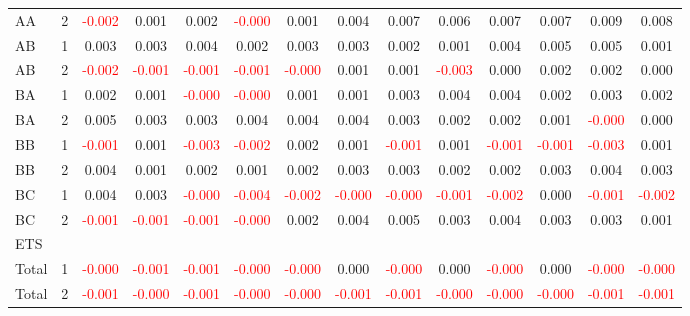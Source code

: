 \begin{table}[!htb]
{\begin{tabular}{llcccccccccccc}
AA & 2 & \textcolor{red}{-0.002} & 0.001 & 0.002 & \textcolor{red}{-0.000} & 0.001 & 0.004 & 0.007 & 0.006 & 0.007 & 0.007 & 0.009 & 0.008\\
AB & 1 & 0.003 & 0.003 & 0.004 & 0.002 & 0.003 & 0.003 & 0.002 & 0.001 & 0.004 & 0.005 & 0.005 & 0.001\\
AB & 2 & \textcolor{red}{-0.002} & \textcolor{red}{-0.001} & \textcolor{red}{-0.001} & \textcolor{red}{-0.001} & \textcolor{red}{-0.000} & 0.001 & 0.001 & \textcolor{red}{-0.003} & 0.000 & 0.002 & 0.002 & 0.000\\
BA & 1 & 0.002 & 0.001 & \textcolor{red}{-0.000} & \textcolor{red}{-0.000} & 0.001 & 0.001 & 0.003 & 0.004 & 0.004 & 0.002 & 0.003 & 0.002\\
BA & 2 & 0.005 & 0.003 & 0.003 & 0.004 & 0.004 & 0.004 & 0.003 & 0.002 & 0.002 & 0.001 & \textcolor{red}{-0.000} & 0.000\\
BB & 1 & \textcolor{red}{-0.001} & 0.001 & \textcolor{red}{-0.003} & \textcolor{red}{-0.002} & 0.002 & 0.001 & \textcolor{red}{-0.001} & 0.001 & \textcolor{red}{-0.001} & \textcolor{red}{-0.001} & \textcolor{red}{-0.003} & 0.001\\
BB & 2 & 0.004 & 0.001 & 0.002 & 0.001 & 0.002 & 0.003 & 0.003 & 0.002 & 0.002 & 0.003 & 0.004 & 0.003\\
BC & 1 & 0.004 & 0.003 & \textcolor{red}{-0.000} & \textcolor{red}{-0.004} & \textcolor{red}{-0.002} & \textcolor{red}{-0.000} & \textcolor{red}{-0.000} & \textcolor{red}{-0.001} & \textcolor{red}{-0.002} & 0.000 & \textcolor{red}{-0.001} & \textcolor{red}{-0.002}\\
BC & 2 & \textcolor{red}{-0.001} & \textcolor{red}{-0.001} & \textcolor{red}{-0.001} & \textcolor{red}{-0.000} & 0.002 & 0.004 & 0.005 & 0.003 & 0.004 & 0.003 & 0.003 & 0.001\\
\hline
ETS &  &  &  &  &  &  &  &  &  &  &  &  & \\
\hline
Total & 1 & \textcolor{red}{-0.000} & \textcolor{red}{-0.001} & \textcolor{red}{-0.001} & \textcolor{red}{-0.000} & \textcolor{red}{-0.000} & 0.000 & \textcolor{red}{-0.000} & 0.000 & \textcolor{red}{-0.000} & 0.000 & \textcolor{red}{-0.000} & \textcolor{red}{-0.000}\\
Total & 2 & \textcolor{red}{-0.001} & \textcolor{red}{-0.000} & \textcolor{red}{-0.001} & \textcolor{red}{-0.000} & \textcolor{red}{-0.000} & \textcolor{red}{-0.001} & \textcolor{red}{-0.001} & \textcolor{red}{-0.000} & \textcolor{red}{-0.000} & \textcolor{red}{-0.000} & \textcolor{red}{-0.001} & \textcolor{red}{-0.001}\\

\end{tabular}}
\end{table}
